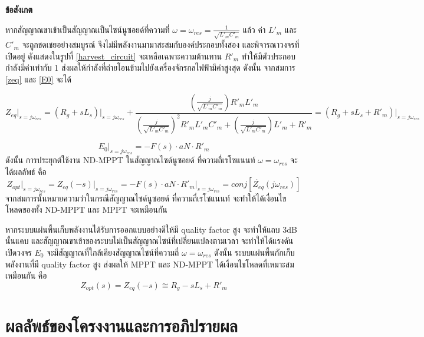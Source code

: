 \documentclass[11pt,a4paper]{article}
\begin{document}
\textbf{ข้อสังเกต}

หากสัญญาณขาเข้าเป็นสัญญาณเป็นไซน์นูซอยด์ที่ความที่ $\omega = \omega_{res} = \frac{1}{\sqrt{L'_{m}C'_{m}}}$ แล้ว
ค่า $ L'_{m} $ และ $ C'_{m} $ จะถูกชดเชยอย่างสมบูรณ์ จึงไม่มีพลังงานมามาสะสมกับองค์ประกอบทั้งสอง และพิจารณาวงจรที่เปิดอยู่ ดังแสดงในรูปที่ \ref{harvest_circuit} จะเหลือเฉพาะความต้านทาน $R'_{m}$ ทำให้มีตัวประกอบกำลังมีค่าเท่ากับ 1 ส่งผลให้กำลังที่ถ่ายโอนข้ามไปยังเครื่องจักรกลไฟฟ้ามีค่าสูงสุด ดังนั้น จากสมการ \ref{zeq} และ \ref{E0} จะได้

\begin{equation}
    Z_{eq}\vert_{s = j\omega_{res}} = (R_{g} + sL_{s}) \vert_{s = j\omega_{res}} + \frac{ ( \frac{j}{\sqrt{L'_{m}C'_{m}}} ) R'_{m}L'_{m} }{ ( \frac{j}{\sqrt{L'_{m}C'_{m}}} )^2R'_{m}L'_{m}C'_{m} + ( \frac{j}{\sqrt{L'_{m}C'_{m}}} )L'_{m} + R'_{m}} = (R_{g} + sL_{s} + R'_{m} )\vert_{s = j\omega_{res}}
\end{equation}

\begin{equation}
    E_{0}\vert_{s = j\omega_{res}} = -F(s) \cdot aN \cdot R'_{m}
\end{equation}
ดังนั้น การประยุกต์ใช้งาน ND-MPPT ในสัญญาณไซด์นูซอยด์ ที่ความถี่เรโซแนนท์ $\omega = \omega_{res}$ จะได้ผลลัพธ์ คือ
\begin{equation}
    Z_{opt}\vert_{s = j\omega_{res}} = Z_{eq}(-s)\vert_{s = j\omega_{res}} = -F(s) \cdot aN \cdot R'_{m} \vert_{s = j\omega_{res}} = conj [ {\dot{ Z_{eq} } (j\omega_{res})} ]
\end{equation}
จากสมการนั้นหมายความว่าในกรณีสัญญาณไซด์นูซอยด์ ที่ความถี่เรโซแนนท์ จะทำให้ได้เงื่อนไขโหลดของทั้ง ND-MPPT และ MPPT จะเหมือนกัน

หากระบบแผ่นพื้นเก็บพลังงานได้รับการออกแบบอย่างดีให้มี quality factor สูง จะทำให้แถบ 3dB นั้นแคบ และสัญญาณขาเข้าของระบบไม่เป็นสัญญาณไซน์ที่เปลี่ยนแปลงตามเวลา
จะทำให้ได้แรงดันเปิดวงจร $E_{0}$ จะมีสัญญาณที่ใกล้เคียงสัญญาณไซน์ที่ความถี่ $\omega = \omega_{res}$ ดังนั้น ระบบแผ่นพื้นกักเก็บพลังงานที่มี quality factor สูง ส่งผลให้ MPPT และ ND-MPPT ได้เงื่อนไขโหลดที่เหมาะสมเหมือนกัน คือ
\begin{equation} \label{}
    Z_{opt}(s)= Z_{eq}(-s) \cong R_g- sL_{s} + R'_{m}
\end{equation}


\newpage

\section{ผลลัพธ์ของโครงงานและการอภิปรายผล}
\end{document}
